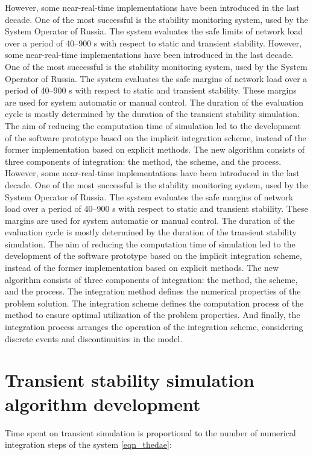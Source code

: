 \documentclass[lettersize,journal]{IEEEtran}
\begin{document}
However, some near-real-time implementations have been introduced in the last decade. One of the most successful is the stability monitoring system, used by the System Operator of Russia. The system evaluates the safe limits of network load over a period of 40–900 s with respect to static and transient stability. However, some near-real-time implementations have been introduced in the last decade. One of the most successful is the stability monitoring system, used by the System Operator of Russia. The system evaluates the safe margins of network load over a period of 40–900 s with respect to static and transient stability. These margins are used for system automatic or manual control. The duration of the evaluation cycle is mostly determined by the duration of the transient stability simulation. The aim of reducing the computation time of simulation led to the development of the software prototype based on the implicit integration scheme, instead of the former implementation based on explicit methods. The new algorithm consists of three components of integration: the method, the scheme, and the process. However, some near-real-time implementations have been introduced in the last decade. One of the most successful is the stability monitoring system, used by the System Operator of Russia. The system evaluates the safe margins of network load over a period of 40–900 s with respect to static and transient stability. These margins are used for system automatic or manual control. The duration of the evaluation cycle is mostly determined by the duration of the transient stability simulation. The aim of reducing the computation time of simulation led to the development of the software prototype based on the implicit integration scheme, instead of the former implementation based on explicit methods. The new algorithm consists of three components of integration: the method, the scheme, and the process. The integration method defines the numerical properties of the problem solution. The integration scheme defines the computation process of the method to ensure optimal utilization of the problem properties. And finally, the integration process arranges the operation of the integration scheme, considering discrete events and discontinuities in the model.

\section{Transient stability simulation algorithm development}
Time spent on transient simulation is proportional to the number of numerical integration steps of the system \eqref{eqn_thedae}: 
\end{document}
